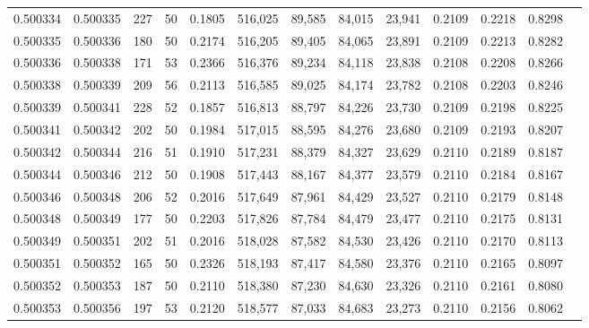 \begin{tabular}{rrrrrrrrrrrrr}
0.500334 & 0.500335 & 227 &  50 &                                     0.1805 & 516,025 &  89,585 &  84,015 &  23,941 & 0.2109 & 0.2218 & 0.8298 \\
0.500335 & 0.500336 & 180 &  50 &                                     0.2174 & 516,205 &  89,405 &  84,065 &  23,891 & 0.2109 & 0.2213 & 0.8282 \\
0.500336 & 0.500338 & 171 &  53 &                                     0.2366 & 516,376 &  89,234 &  84,118 &  23,838 & 0.2108 & 0.2208 & 0.8266 \\
0.500338 & 0.500339 & 209 &  56 &                                     0.2113 & 516,585 &  89,025 &  84,174 &  23,782 & 0.2108 & 0.2203 & 0.8246 \\
0.500339 & 0.500341 & 228 &  52 &                                     0.1857 & 516,813 &  88,797 &  84,226 &  23,730 & 0.2109 & 0.2198 & 0.8225 \\
0.500341 & 0.500342 & 202 &  50 &                                     0.1984 & 517,015 &  88,595 &  84,276 &  23,680 & 0.2109 & 0.2193 & 0.8207 \\
0.500342 & 0.500344 & 216 &  51 &                                     0.1910 & 517,231 &  88,379 &  84,327 &  23,629 & 0.2110 & 0.2189 & 0.8187 \\
0.500344 & 0.500346 & 212 &  50 &                                     0.1908 & 517,443 &  88,167 &  84,377 &  23,579 & 0.2110 & 0.2184 & 0.8167 \\
0.500346 & 0.500348 & 206 &  52 &                                     0.2016 & 517,649 &  87,961 &  84,429 &  23,527 & 0.2110 & 0.2179 & 0.8148 \\
0.500348 & 0.500349 & 177 &  50 &                                     0.2203 & 517,826 &  87,784 &  84,479 &  23,477 & 0.2110 & 0.2175 & 0.8131 \\
0.500349 & 0.500351 & 202 &  51 &                                     0.2016 & 518,028 &  87,582 &  84,530 &  23,426 & 0.2110 & 0.2170 & 0.8113 \\
0.500351 & 0.500352 & 165 &  50 &                                     0.2326 & 518,193 &  87,417 &  84,580 &  23,376 & 0.2110 & 0.2165 & 0.8097 \\
0.500352 & 0.500353 & 187 &  50 &                                     0.2110 & 518,380 &  87,230 &  84,630 &  23,326 & 0.2110 & 0.2161 & 0.8080 \\
0.500353 & 0.500356 & 197 &  53 &                                     0.2120 & 518,577 &  87,033 &  84,683 &  23,273 & 0.2110 & 0.2156 & 0.8062 \\

\end{tabular}
